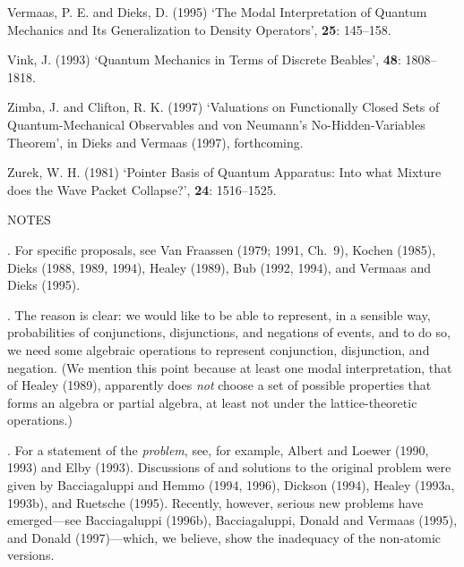 \documentclass[12pt]{article}
\begin{document}
\begin{thebibliography}{10}
Vermaas, P. E. and Dieks, D. (1995)
\newblock `The Modal Interpretation of Quantum Mechanics and Its
Generalization to Density Operators',
 {\bf 25}: 145--158.

Vink, J.  (1993)
\newblock `Quantum Mechanics in Terms of Discrete Beables',
 {\bf 48}: 1808--1818.

Zimba, J. and Clifton, R. K. (1997)
\newblock `Valuations on Functionally Closed Sets of
Quantum-Mechanical Observables and von Neumann's No-Hidden-Variables
Theorem',
\newblock in Dieks and Vermaas (1997), forthcoming.

Zurek, W. H. (1981)
\newblock `Pointer Basis of Quantum Apparatus: Into what Mixture does
the Wave Packet Collapse?',
 {\bf 24}: 1516--1525.

\end{thebibliography}

\newpage
\begin{center}
NOTES
\end{center}
\vspace*{40pt}
. For specific proposals, see Van Fraassen (1979; 1991, Ch.~9),
Kochen (1985), Dieks (1988, 1989, 1994), Healey (1989), Bub (1992, 
1994), and Vermaas and Dieks (1995).

\vspace*{12pt}

.  The reason is clear: we would like to
be able to represent, in a sensible way, probabilities of 
conjunctions, disjunctions, and negations of events, and to do so, we 
need some algebraic operations to represent conjunction, disjunction, 
and negation.  (We mention this point because at least one modal 
interpretation, that of Healey (1989), apparently does {\it not} 
choose a set of possible properties that forms an algebra or partial 
algebra, at least not under the lattice-theoretic operations.)

\vspace*{12pt}

.  For a statement of the {\it problem}, see, for
example, Albert and Loewer (1990, 1993) and Elby (1993).  Discussions 
of and solutions to the original problem were given by Bacciagaluppi 
and Hemmo (1994, 1996), Dickson (1994), Healey (1993a, 1993b), and 
Ruetsche (1995).  Recently, however, serious new problems have 
emerged---see Bacciagaluppi (1996b), Bacciagaluppi, Donald and Vermaas 
(1995), and Donald (1997)---which, we believe, show the inadequacy of 
the non-atomic versions.
\end{document}
